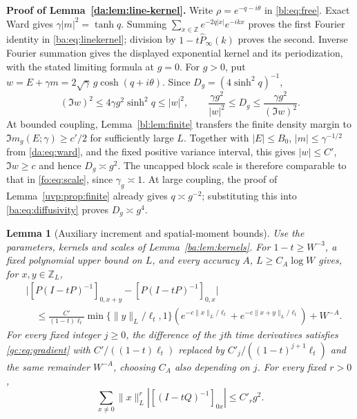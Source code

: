 \documentclass[11pt]{article}
\numberwithin{equation}{section}
\newtheorem{lemma}[theorem]{Lemma}
\theoremstyle{remark}
\newcommand{\Z}{\mathbb Z}
\begin{document}
\noindent\textbf{Proof of Lemma~\ref{da:lem:line-kernel}.}
Write $\rho=e^{-q-i\theta}$ in \eqref{bl:eq:free}. Exact Ward gives
$\gamma|m|^2=\tanh q$. Summing
$\sum_{x\in\Z}e^{-2q|x|}e^{-ikx}$ proves the first Fourier identity
in \eqref{ba:eq:linekernel}; division by $1-t\widehat P_\infty(k)$ proves
the second. Inverse Fourier summation gives the displayed exponential
kernel and its periodization, with the stated limiting formula at $g=0$.
For $g>0$, put $w=E+\gamma m=2\sqrt\gamma\,g\cosh(q+i\theta)$.
Since $D_g=(4\sinh^2q)^{-1}$,
\[
 (\Im w)^2\le4\gamma g^2\sinh^2q\le|w|^2,\qquad
 \frac{\gamma g^2}{|w|^2}\le D_g\le\frac{\gamma g^2}{(\Im w)^2}.
\]
At bounded coupling, Lemma~\ref{bl:lem:finite} transfers the finite
density margin to $\Im m_g(E;\gamma)\ge c'/2$ for sufficiently large $L$.
Together with $|E|\le B_0$, $|m|\le\gamma^{-1/2}$ from
\eqref{da:eq:ward}, and the fixed positive variance interval, this gives
$|w|\le C'$, $\Im w\ge c$ and hence $D_g\asymp g^2$.
The uncapped block scale is therefore comparable to that in
\eqref{fo:eq:scale}, since $\gamma_g\asymp1$.
At large coupling, the proof of Lemma~\ref{uvp:prop:finite}
already gives $q\asymp g^{-2}$; substituting this into
\eqref{ba:eq:diffusivity} proves $D_g\asymp g^4$.

\begin{lemma}[Auxiliary increment and spatial-moment bounds]
\label{da:lem:transport-refinements}
Use the parameters, kernels and scales of Lemma~\ref{ba:lem:kernels}.
For $1-t\ge W^{-3}$, a fixed polynomial upper bound on $L$, and every accuracy $A$,
$L\ge C_A\log W$ gives, for $x,y\in\Z_L$,
\begin{equation}\label{gc:eq:gradient}
 \begin{split}
 &\bigl|[P(I-tP)^{-1}]_{0,x+y}-[P(I-tP)^{-1}]_{0,x}\bigr|\\
 &\quad\le\frac {C'}{(1-t)\ell_t}\min\{\|y\|_L/\ell_t,1\}
 \left(e^{-c\|x\|_L/\ell_t}+e^{-c\|x+y\|_L/\ell_t}\right)+W^{-A}.
 \end{split}
\end{equation}
For every fixed integer $j\ge0$, the difference of the $j$th time
derivatives satisfies \eqref{gc:eq:gradient} with
$C'/((1-t)\ell_t)$ replaced by $C'_j/((1-t)^{j+1}\ell_t)$ and
the same remainder $W^{-A}$, choosing $C_A$ also depending on $j$.
For every fixed $r>0$,
\begin{equation}\label{da:eq:stable-spatial-moments}
 \sum_{x\ne0}\|x\|_L^r|[(I-tQ)^{-1}]_{0x}|\le C'_r g^2.
\end{equation}
\end{lemma}
\end{document}

